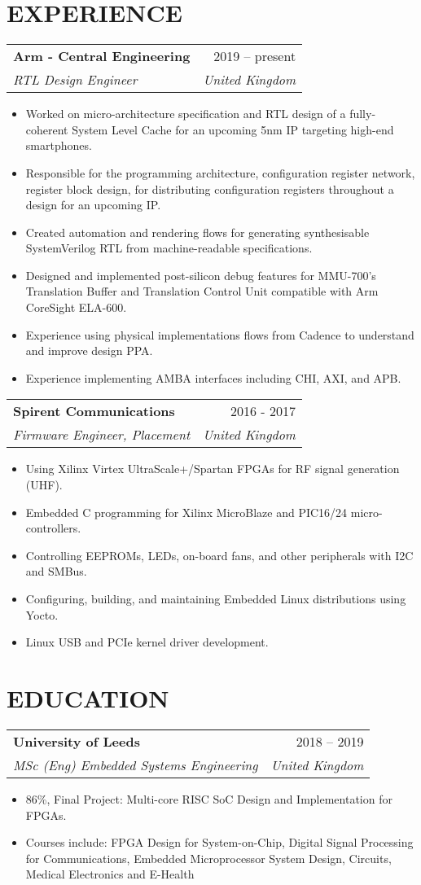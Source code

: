 \documentclass[letterpaper,11pt]{article}
\makeatletter
\newcommand{\resumeItem}[1]{
  \item\small{
    {#1 \vspace{-5pt}}
  }
}
\newcommand{\resumeSubheading}[4]{
  \vspace{-1pt}
    \begin{tabular*}{\textwidth}{l@{\extracolsep{\fill}}r}
      \textbf{#1} & #2 \\
      \textit{#3} & \textit{#4} \\
    \end{tabular*}\vspace{-3pt}
}
\newcommand{\resumeItemListStart}{\begin{itemize}}
\newcommand{\resumeItemListEnd}{\end{itemize}\vspace{-5pt}}
\makeatother
\begin{document}
\section{EXPERIENCE}
    \resumeSubheading{Arm - Central Engineering}{2019 -- present}{RTL Design Engineer}{United Kingdom}
    \resumeItemListStart
        \resumeItem{Worked on micro-architecture specification and RTL design of a fully-coherent System Level Cache for an upcoming 5nm IP targeting high-end smartphones.}
        \resumeItem{Responsible for the programming architecture, configuration register network, register block design, for distributing configuration registers throughout a design for an upcoming IP.}
        \resumeItem{Created automation and rendering flows for generating synthesisable SystemVerilog RTL from machine-readable specifications.}
        \resumeItem{Designed and implemented post-silicon debug features for MMU-700's Translation Buffer and Translation Control Unit compatible with Arm CoreSight ELA-600.}
        \resumeItem{Experience using physical implementations flows from Cadence to understand and improve design PPA.}
        \resumeItem{Experience implementing AMBA interfaces including CHI, AXI, and APB.}
    \resumeItemListEnd
    \vspace{15pt}
    \resumeSubheading{Spirent Communications}{2016 - 2017}{Firmware Engineer, Placement}{United Kingdom}
    \resumeItemListStart
        \resumeItem{Using Xilinx Virtex UltraScale+/Spartan FPGAs for RF signal generation (UHF).}
        \resumeItem{Embedded C programming for Xilinx MicroBlaze and PIC16/24 micro-controllers.}
        \resumeItem{Controlling EEPROMs, LEDs, on-board fans, and other peripherals with I2C and SMBus.}
        \resumeItem{Configuring, building, and maintaining Embedded Linux distributions using Yocto.}
        \resumeItem{Linux USB and PCIe kernel driver development.}
    \resumeItemListEnd

\vspace{10pt}
\section{EDUCATION}
    \resumeSubheading{University of Leeds}{2018 -- 2019}{MSc (Eng) Embedded Systems Engineering}{United Kingdom}
    \resumeItemListStart
        \resumeItem{86\%, Final Project: Multi-core RISC SoC Design and Implementation for FPGAs.}
        \resumeItem{Courses include: FPGA Design for System-on-Chip, Digital Signal Processing for Communications, Embedded
Microprocessor System Design, Circuits, Medical Electronics and E-Health}
    \resumeItemListEnd
    
\end{document}
